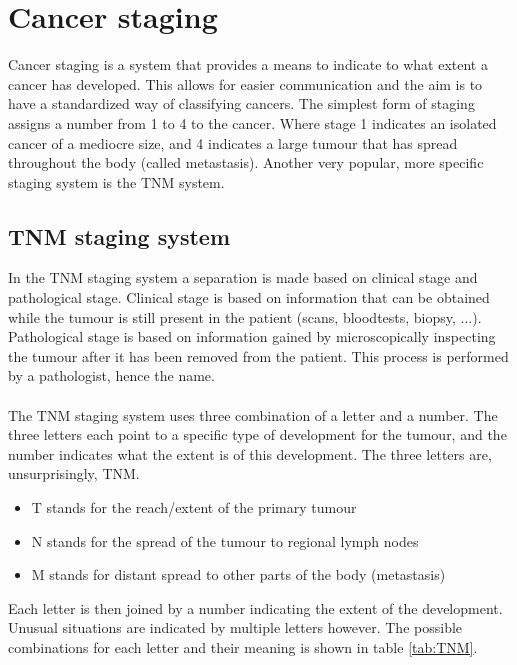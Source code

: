 \chapter{Cancer staging}
\label{app:cancer-staging}
Cancer staging is a system that provides a means to indicate to what extent a cancer has developed. This allows for easier communication and the aim is to have a standardized way of classifying cancers. The simplest form of staging assigns a number from 1 to 4 to the cancer. Where stage 1 indicates an isolated cancer of a mediocre size, and 4 indicates a large tumour that has spread throughout the body (called metastasis). Another very popular, more specific staging system is the TNM system.

\section{TNM staging system}
In the TNM staging system a separation is made based on clinical stage and pathological stage. Clinical stage is based on information that can be obtained while the tumour is still present in the patient (scans, bloodtests, biopsy, ...). Pathological stage is based on information gained by microscopically inspecting the tumour after it has been removed from the patient. This process is performed by a pathologist, hence the name. \\ \\
The TNM staging system uses three combination of a letter and a number. The three letters each point to a specific type of development for the tumour, and the number indicates what the extent is of this development. The three letters are, unsurprisingly, TNM.
\begin{itemize}
	\item T stands for the reach/extent of the primary tumour
	\item N stands for the spread of the tumour to regional lymph nodes
	\item M stands for distant spread to other parts of the body (metastasis)
\end{itemize}
Each letter is then joined by a number indicating the extent of the development. Unusual situations are indicated by multiple letters however. The possible combinations for each letter and their meaning is shown in table \ref{tab:TNM}.
